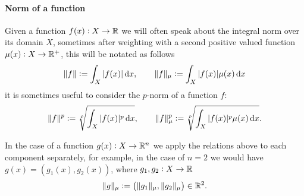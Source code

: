 \paragraph{Norm of a function}
Given a function $f(x): X\to\mathbb{R}$ we will often speak about the integral norm over its
domain $X$, sometimes after weighting with a second positive valued function
$\mu(x): X\to\mathbb{R}^+$, this will be notated as follows
\begin{displaymath}
\|f\| := \int_X |f(x)| \mathop{}\!\mathrm{d} x, \qquad \|f\|_\mu := \int_X |f(x)| \mu(x) \mathop{}\!\mathrm{d} x
\end{displaymath}
it is sometimes useful to consider the $p$-norm of a function $f$:
\begin{displaymath}
\|f\|^p := \sqrt[p]{\int_X |f(x)|^p \mathop{}\!\mathrm{d} x}, \qquad \|f\|_\mu^p := \sqrt[p]{\int_X |f(x)|^p \mu(x)\mathop{}\!\mathrm{d} x}.
\end{displaymath}

In the case of a function $g(x): X\to\mathbb{R}^n$ we apply the relations above to
each component separately, for example, in the case of $n = 2$ we would have
$g(x) = (g_1(x), g_2(x))$, where $g_1,g_2:X\to\mathbb{R}$
\begin{displaymath}
\|g\|_\mu := \left(\|g_1\|_\mu, \|g_2\|_\mu\right) \in \mathbb{R}^2.
\end{displaymath}
